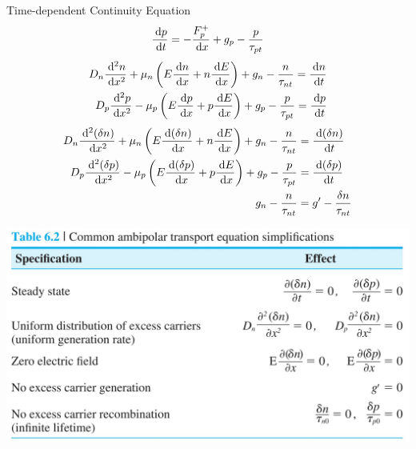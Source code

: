\documentclass[a4paper, twocolumn]{article}
\begin{document}
    \par Time-dependent Continuity Equation
    \begin{equation*}
        \begin{aligned}
            \frac{\: \mathrm{d} p}{\: \mathrm{d} t} = - \frac{F_p^+}{\: \mathrm{d} x} + g_p - \frac{p}{\tau_{pt}}
        \end{aligned}
    \end{equation*}
    \begin{equation*}
            \begin{aligned}
                D_n \frac{\: \mathrm{d}^2 n}{\: \mathrm{d} x^2} + \mu_n \left( E \frac{\: \mathrm{d} n}{\: \mathrm{d} x} + n \frac{\: \mathrm{d} E}{\: \mathrm{d} x}  \right) + g_n - \frac{n}{\tau_{nt}} = \frac{\: \mathrm{d} n}{\: \mathrm{d} t} \\
                D_p \frac{\: \mathrm{d}^2 p}{\: \mathrm{d} x^2} - \mu_p \left( E \frac{\: \mathrm{d} p}{\: \mathrm{d} x} + p \frac{\: \mathrm{d} E}{\: \mathrm{d} x}  \right) + g_p - \frac{p}{\tau_{pt}} = \frac{\: \mathrm{d} p}{\: \mathrm{d} t} \\
            \end{aligned}
    \end{equation*}
    \begin{equation*}
            \begin{aligned}
                D_n \frac{\: \mathrm{d}^2 (\delta n)}{\: \mathrm{d} x^2} + \mu_n \left( E \frac{\: \mathrm{d} (\delta n)}{\: \mathrm{d} x} + n \frac{\: \mathrm{d} E}{\: \mathrm{d} x}  \right) + g_n - \frac{n}{\tau_{nt}} &= \frac{\: \mathrm{d} (\delta n)}{\: \mathrm{d} t} \\
                D_p \frac{\: \mathrm{d}^2 (\delta p)}{\: \mathrm{d} x^2} - \mu_p \left( E \frac{\: \mathrm{d} (\delta p)}{\: \mathrm{d} x} + p \frac{\: \mathrm{d} E}{\: \mathrm{d} x}  \right) + g_p - \frac{p}{\tau_{pt}} &= \frac{\: \mathrm{d} (\delta p)}{\: \mathrm{d} t} \\
                g_n - \frac{n}{\tau_{nt}} &= g^\prime - \frac{\delta n}{\tau_{nt}}
            \end{aligned}
    \end{equation*}
    
        \includegraphics[width=0.9\linewidth]{Equation-simplification.jpg}
    
\end{document}
